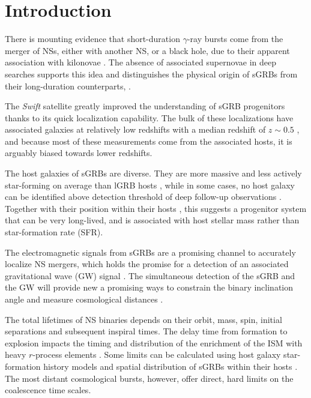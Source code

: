 \documentclass{aa}    %
\begin{document}
\maketitle

\section{Introduction}


There is mounting evidence that short-duration $\gamma$-ray bursts
come from the merger of NSs, either with another NS, or a black
hole, due to their apparent association with kilonovae \citep{Barnes2013a,
	Tanvir2013b, Yang2015, Jin2016, Rosswog2016}. The absence of associated
supernovae in deep searches \citep[e.g.][]{Hjorth2005a,Fox2005,Hjorth2005b, Kann2011}
supports this idea and distinguishes the physical origin of sGRBs from their
long-duration counterparts, \citep[albeit see also][]{Fynbo2006b, Valle2006, Gal-Yam2006}.

The \textit{Swift} satellite \citep{Gehrels2004} greatly improved the
understanding of sGRB progenitors thanks to its quick localization capability.
The bulk of these localizations have associated galaxies at relatively low
redshifts with a median redshift of $z\sim0.5$ \citep{Berger2014}, and because
most of these measurements come from the associated hosts, it is arguably biased
towards lower redshifts.

The host galaxies of sGRBs are diverse. They are more massive and less actively
star-forming on average than lGRB hosts \citep{Fong2013b}, while in some cases,
no host galaxy can be identified above detection threshold of deep follow-up
observations \citep{Berger2010a, Tunnicliffe2014}. Together with their position
within their hosts \citep{Fong2013a}, this suggests a progenitor system that can
be very long-lived, and is associated with host stellar mass rather than
star-formation rate (SFR).

The electromagnetic signals from sGRBs are a promising channel to accurately
localize NS mergers, which holds the promise for a detection of an associated
gravitational wave (GW) signal \citep{Ghirlanda2016}. The simultaneous detection
of the sGRB and the GW will provide new a promising ways to constrain the binary
inclination angle \citep{Arun2014} and measure cosmological distances
\citep{Nissanke2010}.

The total lifetimes of NS binaries depends on their orbit, mass, spin, initial
separations and subsequent inspiral times. The delay time from formation to
explosion impacts the timing and distribution of the enrichment of the ISM with
heavy $r$-process elements \citep{VandeVoort2015, Wallner2015,  Ji2016}. Some
limits can be calculated using host galaxy star-formation history models and
spatial distribution of sGRBs within their hosts \citep[][]{Berger2014}. The
most distant cosmological bursts, however, offer direct, hard limits on the
coalescence time scales.
\end{document}
